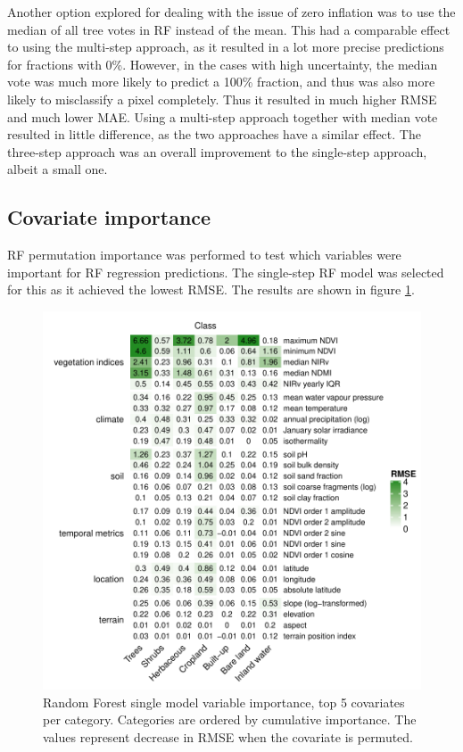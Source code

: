 \documentclass[review,authoryear,3p]{elsarticle}
\begin{document}
Another option explored for dealing with the issue of zero inflation was to use the median of all tree votes in \gls{RF} instead of the mean.
This had a comparable effect to using the multi-step approach, as it resulted in a lot more precise predictions for fractions with 0\%.
However, in the cases with high uncertainty, the median vote was much more likely to predict a 100\% fraction, and thus was also more likely to misclassify a pixel completely.
Thus it resulted in much higher \gls{RMSE} and much lower \gls{MAE}.
Using a multi-step approach together with median vote resulted in little difference, as the two approaches have a similar effect.
The three-step approach was an overall improvement to the single-step approach, albeit a small one.

\subsection{Covariate importance}

\Gls{RF} permutation importance was performed to test which variables were important for \gls{RF} regression predictions.
The single-step \gls{RF} model was selected for this as it achieved the lowest \gls{RMSE}.
The results are shown in figure \ref{fig-varimp}.

\begin{figure}
    \centering
    \includegraphics[width=14cm]{article-figures/heatmaps/2020-06-19-varimp-heatmap-top5}
    \caption{Random Forest single model variable importance, top 5 covariates per category. Categories are ordered by cumulative importance. The values represent decrease in RMSE when the covariate is permuted.}
    \label{fig-varimp}
\end{figure}
\end{document}
